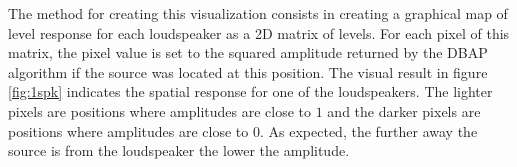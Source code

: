 \documentclass[twoside,10pt]{article}
\begin{document}

The method for creating this visualization consists in creating a graphical map of level response for each loudspeaker as a 2D matrix of levels. For each pixel of this matrix, the pixel value is set to the squared amplitude returned by the DBAP algorithm if the source was located at this position. The visual result in figure \ref{fig:1spk} indicates the spatial response for one of the loudspeakers. The lighter pixels are positions where amplitudes are close to $1$ and the darker pixels are positions where amplitudes are close to $0$. As expected, the further away the source is from the loudspeaker the lower the amplitude. 


\end{document}

